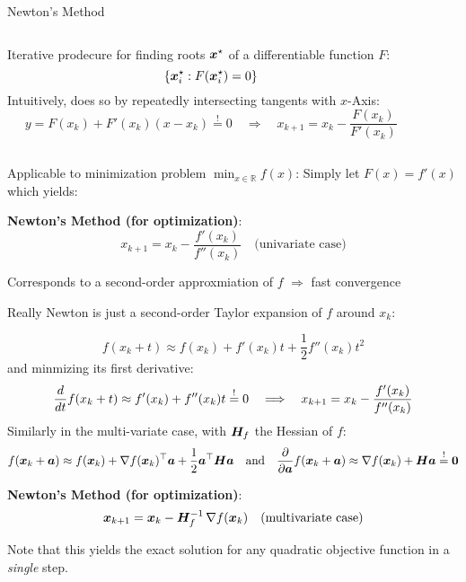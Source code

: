 \begin{frame}{Newton's Method}
    \begin{columns}[onlytextwidth]
        \begin{column}{0.65\textwidth}
            Iterative prodecure for finding roots $\bm{x}^\star$ of a differentiable function $F$:
            $$\{ \bm{x}_i^\star : F(\bm{x}_i^\star) = 0 \}$$
            Intuitively, does so by repeatedly intersecting tangents with $x$-Axis:
            $$y=F(x_k) + F'(x_k)(x-x_k) \overset{!}{=} 0 \quad \Longrightarrow \quad x_{k+1} = x_k - \frac{F(x_k)}{F'(x_k)}$$

        \end{column}
        \begin{column}{0.35\textwidth}
            \begin{flushright}
                
            \end{flushright}
        \end{column}
    \end{columns}

    Applicable to minimization problem $\min_{x \in \mathbb{R}} f(x)$:
    Simply let $F(x) = f'(x)$ which yields:
    \begin{boxed}
        \textbf{Newton's Method (for optimization)}:
        $$x_{k+1} = x_k - \frac{f'(x_k)}{f''(x_k)} \quad \text{(univariate case)}$$
    \end{boxed}

    Corresponds to a second-order approxmiation of $f$ $\Rightarrow$ fast convergence
\end{frame}

\begin{frame}
    \vspace*{5mm}
    Really Newton is just a second-order Taylor expansion of $f$ around $x_k$:

    $$f(x_k + t) \approx  f(x_k) + f'(x_k) t + \frac{1}{2} f''(x_k) t^2$$
    and minmizing its first derivative:
    $${d \over dt} f(x_k + t) \approx  f'(x_k) + f''(x_k) t \overset{!}{=} 0 \quad \Longrightarrow
        \quad x_{k+1} = x_k - \frac{f'(x_k)}{f''(x_k)}
    $$
    Similarly in the multi-variate case, with $\bm{H}_f$ the Hessian of $f$:
    $$
        f(\bm{x}_k + \bm{a}) \approx f(\bm{x}_k) + \nabla f(\bm{x}_k)^\top \bm{a} + \frac12 \bm{a}^\top \bm{H} \bm{a}
        \quad \text{and} \quad
        {\partial \over \partial \bm{a}} f(\bm{x}_k + \bm{a}) \approx \nabla f(\bm{x}_k) + \bm{H} \bm{a} \overset{!}{=} \bm{0}
    $$

    \begin{boxed}
        \textbf{Newton's Method (for optimization)}:
        $$\bm{x}_{k+1} = \bm{x}_k - \bm{H}_f^{-1}\,\nabla f(\bm{x}_k) \quad \text{(multivariate case)}$$

        Note that this yields the exact solution for any quadratic objective function in a \emph{single} step.
    \end{boxed}
\end{frame}

